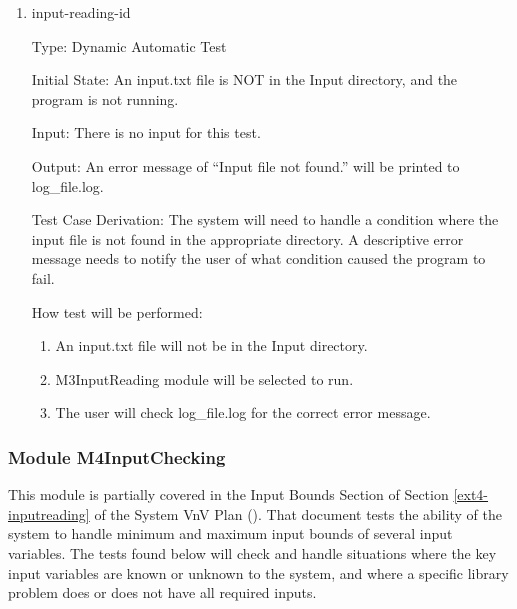 \documentclass[12pt, titlepage]{article}
\newcounter{uvtestcounter} %
\begin{document}
\begin{enumerate}

\item{input-reading-id\theuvtestcounter\\}

Type: Dynamic Automatic Test
					
Initial State: An input.txt file is NOT in the Input directory, and the program is not running.
					
Input: There is no input for this test.
					
Output: An error message of ``Input file not found.'' will be printed to log\_file.log.

Test Case Derivation: The system will need to handle a condition where the input file is not found in the appropriate directory. A descriptive error message needs to notify the user of what condition caused the program to fail.

How test will be performed: 
\begin{enumerate}
	\item An input.txt file will not be in the Input directory.
	\item M3InputReading module will be selected to run.
	\item The user will check log\_file.log for the correct error message.
\end{enumerate}
					
\end{enumerate}

\subsubsection{Module M4InputChecking}
\label{inchecking}

This module is partially covered in the Input Bounds Section of Section \ref{ext4-inputreading} of the System VnV Plan (\citet{LBM_SVNV_PM}). That document tests the ability of the system to handle minimum and maximum input bounds of several input variables. The tests found below will check and handle situations where the key input variables are known or unknown to the system, and where a specific library problem does or does not have all required inputs. 
\end{document}

